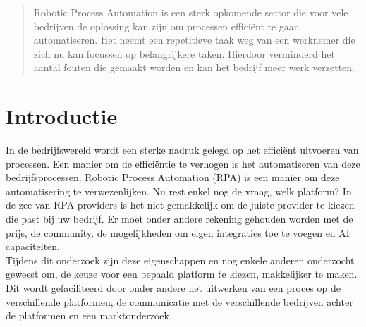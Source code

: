 \documentclass[a0,portrait]{a0poster}
\begin{document}
\begin{multicols}{2}


\color{HoGentAccent1}

\begin{abstract}
	Robotic Process Automation is een sterk opkomende sector die voor vele bedrijven de oplossing kan zijn om processen efficiënt te gaan automatiseren. Het neemt een repetitieve taak weg van een werknemer die zich nu kan focussen op belangrijkere taken. Hierdoor verminderd het aantal fouten die gemaakt worden en kan het bedrijf meer werk verzetten.
\end{abstract}

\color{HoGentAccent1} 
\section*{Introductie}
\color{black}
In de bedrijfswereld wordt een sterke nadruk gelegd op het efficiënt uitvoeren van processen. Een manier om de efficiëntie te verhogen is het automatiseren van deze bedrijfsprocessen. Robotic Process Automation (RPA) is een manier om deze automatisering te verwezenlijken. Nu rest enkel nog de vraag, welk platform? In de zee van RPA-providers is het niet gemakkelijk om de juiste provider te kiezen die past bij uw bedrijf. Er moet onder andere rekening gehouden worden met de prijs, de community, de mogelijkheden om eigen integraties toe te voegen en AI capaciteiten.\\
Tijdens dit onderzoek zijn deze eigenschappen en nog enkele anderen onderzocht geweest om, de keuze voor een bepaald platform te kiezen, makkelijker te maken. Dit wordt gefaciliteerd door onder andere het uitwerken van een proces op de verschillende platformen, de communicatie met de verschillende bedrijven achter de platformen en een marktonderzoek.

\color{Black}
\color{HoGentAccent1} 

\end{multicols}
\end{document}
